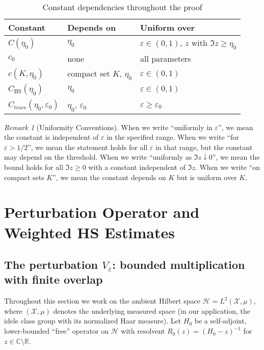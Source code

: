 ﻿\documentclass[12pt,a4paper]{article}
\theoremstyle{definition}
\theoremstyle{remark}
\newtheorem{remark}[theorem]{Remark}
\begin{document}
\begin{table}[h]
\centering
\begin{tabular}{|l|l|l|}
\hline
\textbf{Constant} & \textbf{Depends on} & \textbf{Uniform over} \\
\hline
$C(\eta_0)$ & $\eta_0$ & $\varepsilon \in (0,1)$, $z$ with $\Im z \geq \eta_0$ \\
$c_0$ & none & all parameters \\
$c(K, \eta_0)$ & compact set $K$, $\eta_0$ & $\varepsilon \in (0,1)$ \\
$C_{\text{HS}}(\eta_0)$ & $\eta_0$ & $\varepsilon \in (0,1)$ \\
$C_{\text{trace}}(\eta_0, \varepsilon_0)$ & $\eta_0$, $\varepsilon_0$ & $\varepsilon \geq \varepsilon_0$ \\
\hline
\end{tabular}
\caption{Constant dependencies throughout the proof}
\label{tab:constants}
\end{table}

\begin{remark}[Uniformity Conventions]
\label{rem:uniformity-conventions}
When we write ``uniformly in $\varepsilon$'', we mean the constant is independent of $\varepsilon$ in the specified range. When we write ``for $\varepsilon > 1/2$'', we mean the statement holds for all $\varepsilon$ in that range, but the constant may depend on the threshold. When we write ``uniformly as $\Im z \downarrow 0$'', we mean the bound holds for all $\Im z \geq 0$ with a constant independent of $\Im z$. When we write ``on compact sets $K$'', we mean the constant depends on $K$ but is uniform over $K$.
\end{remark}

\section{Perturbation Operator and Weighted HS Estimates}
\label{sec:HS-bounds}

\subsection{The perturbation $V_\varepsilon$: bounded multiplication with finite overlap}
\label{subsec:bounded-finite-overlap}

Throughout this section we work on the ambient Hilbert space
$\mathcal{H}=L^2(\mathcal{X},\mu)$, where $(\mathcal{X},\mu)$ denotes the
underlying measured space (in our application, the idele class group with its
normalized Haar measure). Let $H_0$ be a self-adjoint, lower-bounded ``free''
operator on $\mathcal{H}$ with resolvent $R_0(z)=(H_0-z)^{-1}$ for $z\in\mathbb{C}\setminus\mathbb{R}$.
\end{document}
